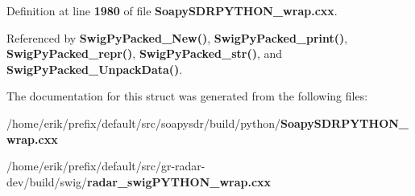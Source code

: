 Definition at line {\bf 1980} of file {\bf Soapy\+S\+D\+R\+P\+Y\+T\+H\+O\+N\+\_\+wrap.\+cxx}.



Referenced by {\bf Swig\+Py\+Packed\+\_\+\+New()}, {\bf Swig\+Py\+Packed\+\_\+print()}, {\bf Swig\+Py\+Packed\+\_\+repr()}, {\bf Swig\+Py\+Packed\+\_\+str()}, and {\bf Swig\+Py\+Packed\+\_\+\+Unpack\+Data()}.



The documentation for this struct was generated from the following files\+:\begin{DoxyCompactItemize}
\item 
/home/erik/prefix/default/src/soapysdr/build/python/{\bf Soapy\+S\+D\+R\+P\+Y\+T\+H\+O\+N\+\_\+wrap.\+cxx}\item 
/home/erik/prefix/default/src/gr-\/radar-\/dev/build/swig/{\bf radar\+\_\+swig\+P\+Y\+T\+H\+O\+N\+\_\+wrap.\+cxx}\end{DoxyCompactItemize}
